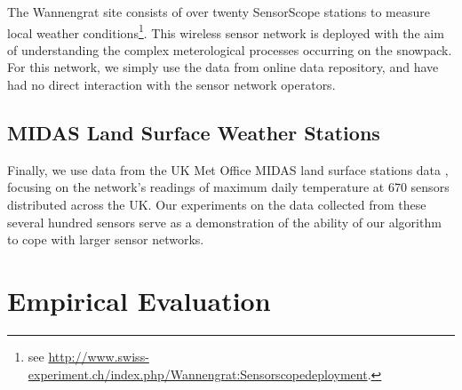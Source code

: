 \documentclass{acmtrans2m}
\begin{document}
The Wannengrat site consists of over twenty SensorScope stations to measure local weather conditions\footnote{see \url{http://www.swiss-experiment.ch/index.php/Wannengrat:Sensorscopedeployment}.}. This wireless sensor network is deployed with the aim of understanding the complex meterological processes occurring on the snowpack. For this network, we simply use the data from online data repository, and have had no direct interaction with the sensor network operators.

\subsection{MIDAS Land Surface Weather Stations}

Finally, we use data from the UK Met Office MIDAS land surface stations data \cite{MIDASdata}, focusing on the network's readings of maximum daily temperature at 670 sensors distributed across the UK. Our experiments on the data collected from these several hundred sensors serve as a demonstration of the ability of our algorithm to cope with larger sensor networks. 

\section{Empirical Evaluation}\label{sec_evaluation}
\end{document}
